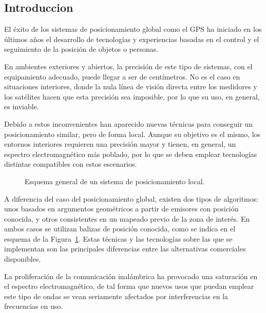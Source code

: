 \subsection{Introduccion}

El éxito de los sistemas de posicionamiento global como el GPS ha iniciado en los últimos años el desarrollo de tecnologías y experiencias basadas en el control y el seguimiento de la posición de objetos o personas.

En ambientes exteriores y abiertos, la precisión de este tipo de sistemas, con el equipamiento adecuado, puede llegar a ser de centímetros.
No es el caso en situaciones interiores, donde la nula línea de visión directa entre los medidores y los satélites hacen que esta precisión sea imposible, por lo que su uso, en general, es inviable.

Debido a estos inconvenientes han aparecido nuevas técnicas para conseguir un posicionamiento similar, pero de forma local.
Aunque su objetivo es el mismo, los entornos interiores requieren una precisión mayor y tienen, en general, un espectro electromagnético más poblado, por lo que se deben emplear tecnologías distintas compatibles con estos escenarios.

\begin{figure}[H]
    \centering
    \def\svgwidth{1.1\linewidth}
    
	\caption{Esquema general de un sistema de posicionamiento local.}
    \label{fig:Gen}
\end{figure}


A diferencia del caso del posicionamiento global, existen dos tipos de algoritmos: unos basados en argumentos geométricos a partir de emisores con posición conocida, y otros consistentes en un mapeado previo de la zona de interés.
En ambos casos se utilizan balizas de posición conocida, como se indica en el esquema de la Figura~\ref{fig:Gen}.
Estas técnicas y las tecnologías sobre las que se implementan son las principales diferencias entre las alternativas comerciales disponibles.

La proliferación de la comunicación inalámbrica ha provocado una saturación en el espectro electromagnético, de tal forma que nuevos usos que puedan emplear este tipo de ondas se vean seriamente afectados por interferencias en la frecuencias en uso.

